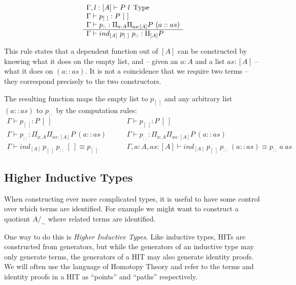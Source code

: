 \[
  \begin{array}{l}
    \Gamma, l : [A] \vdash P~l \; \operatorname{Type}\\
    \Gamma \vdash p_{[~]} : P~[~]\\
    \Gamma \vdash p_{::}: \Pi_{a:A} \Pi_{as:[A]} P~(a :: as)\\
    \hline
    \Gamma \vdash ind_{[A]}~p_{[~]}~p_{::} : \Pi_{[A]} P
  \end{array}
\]

This rule states that a dependent function out of $[A]$ can be constructed by
knowing what it does on the empty list, and -- given an $a:A$ and a list $as:[A]$ -- what
it does on $(a :: as)$. It is not a coincidence that we require two terms --
they correspond precisely to the two constructors.

The resulting function maps the empty list to $p_{[~]}$ and any arbitrary list
$(a::as)$ to $p_{::}$ by the computation rules:
\begin{equation*}
  \begin{array}{c}
    \Gamma \vdash p_{[~]} : P~[~]\\
    \Gamma \vdash p_{::}: \Pi_{a:A} \Pi_{as:[A]} P~(a :: as)\\
    \hline
    \Gamma \vdash ind_{[A]}~p_{[~]}~p_{::}~[~] \equiv p_{[~]}
  \end{array}
\qquad
  \begin{array}{c}
    \Gamma \vdash p_{[~]} : P~[~]\\
    \Gamma \vdash p_{::}: \Pi_{a:A} \Pi_{as:[A]} P~(a :: as)\\
    \hline
    \Gamma, a:A, as:[A] \vdash ind_{[A]}~p_{[~]}~p_{::}~(a::as) \equiv p_{::}~a~as
  \end{array}
\end{equation*}

\subsection{Higher Inductive Types}

When constructing ever more complicated types, it is useful to have some
control over which terms are identified. For example we might want to construct
a quotient $A/_\sim$ where related terms are identified.

One way to do this is \emph{Higher Inductive Types}. Like inductive types, HITs
are constructed from generators, but while the generators of an inductive type
may only generate terms, the generators of a HIT may also generate identity
proofs. We will often use the language of Homotopy Theory and refer to the terms
and identity proofs in a HIT as ``points'' and ``paths'' respectively.

